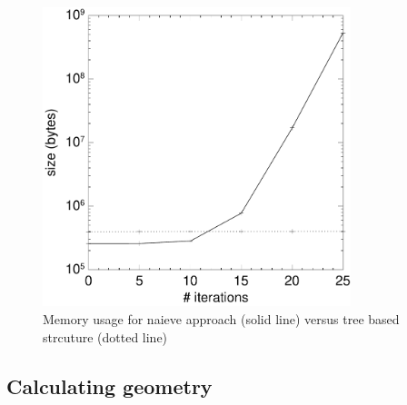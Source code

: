 \documentclass[11pt,a4paper]{article}
\begin{document}
\begin{figure}[h!]
  \centering
  \includegraphics[width=0.8\textwidth]{bench.pdf}
  \caption{Memory usage for naieve approach (solid line) versus tree based strcuture (dotted line)}
  \label{fig:bench}
\end{figure}

\subsection{Calculating geometry}
\end{document}
